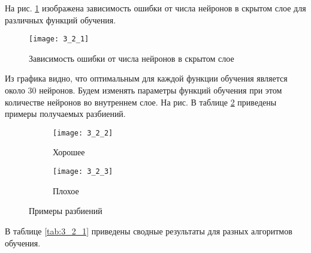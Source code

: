 На рис. \ref{fig:3_2_1} изображена зависимость ошибки от числа нейронов в скрытом слое для различных функций обучения.
\begin{figure}[H]
\begin{center}
	\texttt{[image: 3\_2\_1]}
	\caption{Зависимость ошибки от числа нейронов в скрытом слое}
	\label{fig:3_2_1}
\end{center}
\end{figure}
Из графика видно, что оптимальным для каждой функции обучения является около $30$ нейронов. Будем изменять параметры функций обучения при этом количестве нейронов во внутреннем слое. На рис. В таблице \ref{fig:3_2} приведены примеры получаемых разбиений. 
\begin{figure}[H]
\begin{center}
	\begin{subfigure}[b]{0.49\textwidth}
		\texttt{[image: 3\_2\_2]}
		\caption{Хорошее}
	\end{subfigure}
	\begin{subfigure}[b]{0.49\textwidth}
		\texttt{[image: 3\_2\_3]}
		\caption{Плохое}
	\end{subfigure}
	\caption{Примеры разбиений}
	\label{fig:3_2}
\end{center}
\end{figure}
В таблице \ref{tab:3_2_1} приведены сводные результаты для разных алгоритмов обучения.
